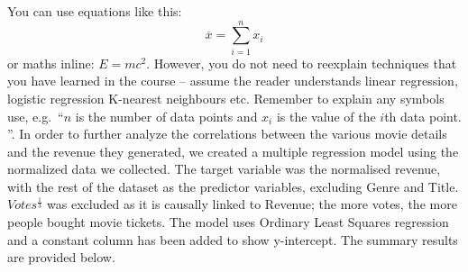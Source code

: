     You can use equations like this:
    \begin{equation}
        \label{fds-project-template:eq:1} \overline{x} = \sum_{i=1}^n x_i
    \end{equation}
    or maths inline: $E=mc^2$.
    However, you do not need to reexplain techniques that you have learned in the
        course -- assume the reader understands linear regression, logistic regression
        K-nearest neighbours etc. Remember to explain any symbols use, e.g.~``$n$ is
        the number of data points and $x_i$ is the value of the $i$th data point.
    ''.
    \newpage
    In order to further analyze the correlations between the various movie details
    and the revenue they generated, we created a multiple regression model using the
    normalized data we collected. 
    The target variable was the normalised revenue, with the rest of the dataset as the 
        predictor variables, excluding Genre and Title.
    $Votes^\frac{1}{3}$ was excluded as it is causally linked to Revenue; the more votes, the more people bought movie tickets. 
    The model uses Ordinary Least Squares regression and a constant column has been added to show y-intercept.
    The summary results are provided below.
